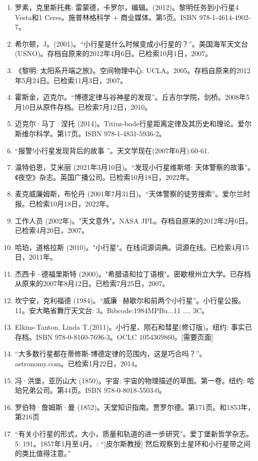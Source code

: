 \begin{enumerate}
\item 罗素，克里斯托弗; 雷蒙德，卡罗尔，编辑。(2012)。黎明任务到小行星4 Vesta和1 Ceres。施普林格科学 + 商业媒体。第5页。ISBN 978-1-4614-4902-7。
\item 希尔顿，J。(2001)。“小行星是什么时候变成小行星的？”。美国海军天文台 (USNO)。存档自原来的2012年4月6日。已检索10月1日，2007。
\item 《黎明: 太阳系开端之旅》。空间物理中心: UCLA。2005。存档自原来的2012年5月24日。已检索11月3日，2007。
\item 霍斯金，迈克尔。“博德定律与谷神星的发现”。丘吉尔学院，剑桥。2008年5月10日从原件存档。已检索7月12日，2010。
\item 迈克尔·马丁·涅托 (2014)。Titius-bode行星距离定律及其历史和理论。爱尔斯维尔科学。第17页。ISBN 978-1-4831-5936-2。
\item “报警!小行星发现背后的故事 ”。天文学现在(2007年6月):60-61.
\item 温特伯恩，艾米丽 (2021年3月10日)。“发现小行星维斯塔: 天体警察的故事”。《夜空》杂志。英国广播公司。已检索10月18日，2022年。
\item 麦克威廉姆斯，布伦丹 (2001年7月31日)。“天体警察的徒劳搜索”。爱尔兰时报。已检索10月18日，2022年。
\item 工作人员 (2002年)。"天文意外"。NASA JPL。存档自原来的2012年2月6日。已检索4月20日，2007。
\item  哈珀，道格拉斯 (2010)。"小行星"。在线词源词典。词源在线。已检索4月15日，2011年。
\item 杰西卡·德福里斯特 (2000)。"希腊语和拉丁语根"。密歇根州立大学。已存档从原来的2007年8月12日。已检索7月25日，2007。
\item 坎宁安，克利福德 (1984)。“威廉·赫歇尔和前两个小行星”。小行星公报。11。安大略省舞厅天文台: 3。Bibcode:1984MPBu...11 .... 3C。
\item Elkins-Tanton, Linda T.(2011)。小行星、陨石和彗星(修订版)。纽约: 事实已存档。ISBN 978-0-8160-7696-3。OCLC 1054369860。[需要页面]
\item “大多数行星都在蒂修斯-博德定律的范围内，这是巧合吗？”。astronomy.com。已检索1月22日，2014。
\item  冯·洪堡，亚历山大 (1850)。宇宙: 宇宙的物理描述的草图。第一卷。纽约: 哈珀兄弟公司。第44页。ISBN 978-0-8018-5503-0。
\item 罗伯特·詹姆斯·曼 (1852)。天堂知识指南。贾罗尔德。第171页。和1853年，第216页
\item “有关小行星的形式，大小，质量和轨道的进一步研究”。爱丁堡新哲学杂志。5: 191。1857年1月至4月。: “[皮尔斯教授] 然后观察到土星环和小行星带之间的类比值得注意。”

\end{enumerate}
